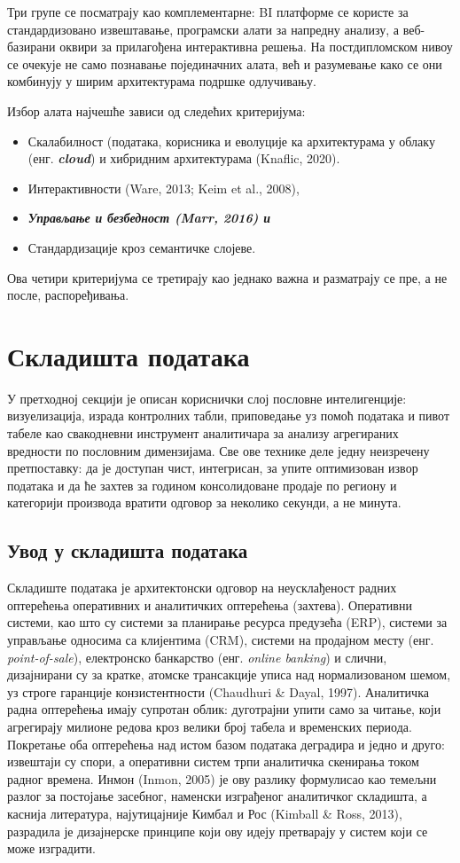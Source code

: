 Три групе се посматрају као комплементарне: BI платформе се користе за стандардизовано извештавање, програмски алати за напредну анализу, а веб-базирани оквири за прилагођена интерактивна решења. На постдипломском нивоу се очекује не само познавање појединачних алата, већ и разумевање како се они комбинују у ширим архитектурама подршке одлучивању.

Избор алата најчешће зависи од следећих критеријума: 

\begin{itemize}
  \item Скалабилност (података, корисника и еволуције ка архитектурама у облаку (енг. \textbf{\textit{cloud}}) и хибридним архитектурама (Knaflic, 2020).
  \item Интерактивности (Ware, 2013; Keim et al., 2008), 
  \item \textbf{\textit{Управљање и безбедност (Marr, 2016) и }}
  \item Стандардизације кроз семантичке слојеве. 
\end{itemize}
Ова четири критеријума се третирају као једнако важна и разматрају се пре, а не после, распоређивања.

\section{Складишта података}
У претходној секцији је описан кориснички слој пословне интелигенције: визуелизација, израда контролних табли, приповедање уз помоћ података и пивот табеле као свакодневни инструмент аналитичара за анализу агрегираних вредности по пословним димензијама. Све ове технике деле једну неизречену претпоставку: да је доступан чист, интегрисан, за упите оптимизован извор података и да ће захтев за годином консолидоване продаје по региону и категорији производа вратити одговор за неколико секунди, а не минута. 

\subsection{Увод у складишта података}
Складиште података је архитектонски одговор на неусклађеност радних оптерећења оперативних и аналитичких оптерећења (захтева). Оперативни системи, као што су системи за планирање ресурса предузећа (ERP), системи за управљање односима са клијентима (CRM), системи на продајном месту (енг. \textit{point-of-sale}), електронско банкарство (енг. \textit{online banking}) и слични, дизајнирани су за кратке, атомске трансакције уписа над нормализованом шемом, уз строге гаранције конзистентности (Chaudhuri \& Dayal, 1997). Аналитичка радна оптерећења имају супротан облик: дуготрајни упити само за читање, који агрегирају милионе редова кроз велики број табела и временских периода. Покретање оба оптерећења над истом базом података деградира и једно и друго: извештаји су спори, а оперативни систем трпи аналитичка скенирања током радног времена. Инмон (Inmon, 2005) је ову разлику формулисао као темељни разлог за постојање засебног, наменски изграђеног аналитичког складишта, а каснија литература, најутицајније Кимбал и Рос (Kimball \& Ross, 2013), разрадила је дизајнерске принципе који ову идеју претварају у систем који се може изградити.


